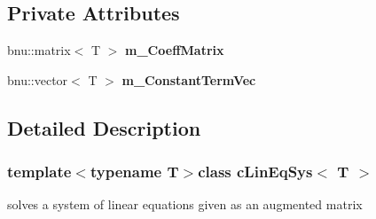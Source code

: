 \subsection*{Private Attributes}
\begin{DoxyCompactItemize}
\item 
\hypertarget{classcLinEqSys_ac270e6753af6ee64fb101b2f487ea492}{bnu\-::matrix$<$ T $>$ {\bfseries m\-\_\-\-Coeff\-Matrix}}\label{classcLinEqSys_ac270e6753af6ee64fb101b2f487ea492}

\item 
\hypertarget{classcLinEqSys_ae6d53e781615a0819bc144adb2f35d77}{bnu\-::vector$<$ T $>$ {\bfseries m\-\_\-\-Constant\-Term\-Vec}}\label{classcLinEqSys_ae6d53e781615a0819bc144adb2f35d77}

\end{DoxyCompactItemize}


\subsection{Detailed Description}
\subsubsection*{template$<$typename T$>$class c\-Lin\-Eq\-Sys$<$ T $>$}

solves a system of linear equations given as an augmented matrix 

